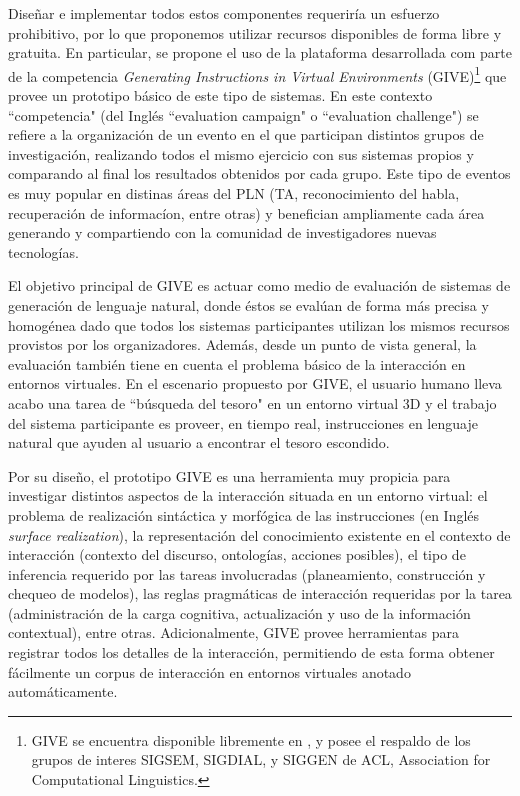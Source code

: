 Dise\~nar e implementar todos estos componentes requerir\'ia un esfuerzo prohibitivo, por lo que proponemos utilizar recursos disponibles de forma libre y gratuita. En particular, se propone el uso de la plataforma desarrollada com parte de la competencia \textit{Generating Instructions in Virtual Environments} (GIVE)\footnote{GIVE se encuentra disponible libremente en  , y posee el respaldo de los grupos de interes SIGSEM, SIGDIAL, y SIGGEN de ACL, Association for Computational Linguistics.} que
provee un prototipo b\'asico de este tipo de sistemas. En este contexto ``competencia" (del Ingl\'es ``evaluation campaign" o ``evaluation challenge") se refiere a la organizaci\'on de un evento en el que participan distintos grupos de investigaci\'on, realizando todos el mismo ejercicio con sus sistemas propios y comparando al final los resultados obtenidos por cada grupo. Este tipo de eventos es muy popular en distinas \'areas del PLN (TA, reconocimiento del habla, recuperaci\'on de informac\'ion, entre otras) y benefician ampliamente cada \'area generando y compartiendo con la comunidad de investigadores nuevas tecnolog\'ias.

El objetivo principal de GIVE es actuar como medio de evaluaci\'on de sistemas de generaci\'on
de lenguaje natural, donde \'estos se eval\'uan de forma m\'as precisa y homog\'enea dado que todos los sistemas participantes utilizan los mismos recursos provistos por los organizadores. Adem\'as, desde un punto de vista general, la evaluaci\'on
tambi\'en tiene en cuenta el problema b\'asico de la interacci\'on en
entornos virtuales.  En el escenario propuesto por GIVE, el usuario
humano lleva acabo una tarea de ``b\'usqueda del tesoro" en un entorno
virtual 3D y el trabajo del sistema participante es proveer, en tiempo
real, instrucciones en lenguaje natural que ayuden al usuario
a encontrar el tesoro escondido.

Por su dise\~no, el prototipo GIVE es una herramienta muy propicia para investigar distintos aspectos de la interacci\'on situada en un entorno virtual:
el problema de realizaci\'on sint\'actica y morf\'ogica de las
instrucciones (en Ingl\'es \emph{surface realization}),
la representaci\'on del conocimiento existente en el contexto de
interacci\'on (contexto del discurso, ontolog\'ias, acciones posibles),
el tipo de inferencia requerido por las tareas involucradas
(planeamiento, construcci\'on y chequeo de modelos),
las reglas pragm\'aticas de interacci\'on requeridas por la tarea
(administraci\'on de la carga cognitiva, actualizaci\'on y uso de la informaci\'on contextual), entre otras. Adicionalmente, GIVE provee herramientas para registrar todos los detalles de la
interacci\'on, permitiendo de esta forma obtener f\'acilmente un corpus de interacci\'on en entornos virtuales anotado autom\'aticamente.








